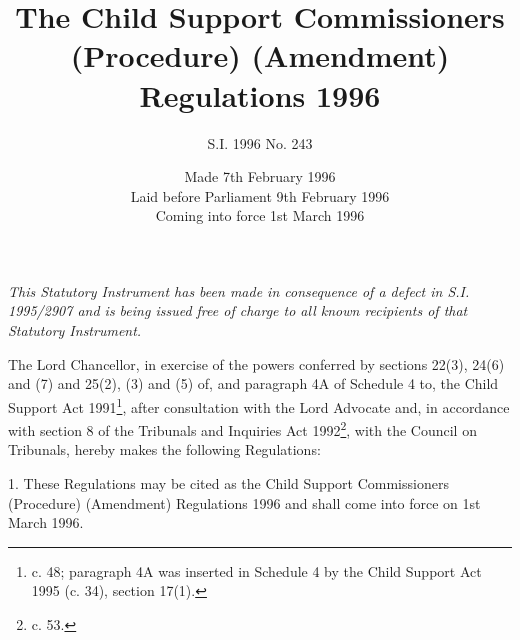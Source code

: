 \documentclass[a4paper]{article}
\title{The Child Support Commissioners (Procedure) (Amendment) Regulations 1996}
\author{S.I. 1996 No. 243}
\date{Made 7th February 1996\\Laid before Parliament 9th February 1996\\Coming into force 1st March 1996
}
\begin{document}
\maketitle

\begin{center}\small\noindent\itshape
This Statutory Instrument has been made in consequence of a defect in S.I. 1995/2907 and is being issued free of charge to all known recipients of that Statutory Instrument.
\end{center}

\noindent
The Lord Chancellor, in exercise of the powers conferred by sections 22(3), 24(6) and (7) and 25(2), (3) and (5) of, and paragraph 4A of Schedule 4 to, the Child Support Act 1991\footnote{ c. 48; paragraph 4A was inserted in Schedule 4 by the Child Support Act 1995 (c. 34), section 17(1).}, after consultation with the Lord Advocate and, in accordance with section 8 of the Tribunals and Inquiries Act 1992\footnote{ c. 53.}, with the Council on Tribunals, hereby makes the following Regulations:

{\sloppy

\tableofcontents

}

\setcounter{secnumdepth}{-2}

\bigskip

1.  These Regulations may be cited as the Child Support Commissioners (Procedure) (Amendment) Regulations 1996 and shall come into force on 1st March 1996.

\medskip
\end{document}
